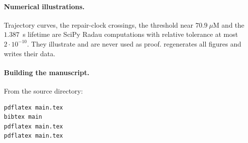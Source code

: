 \documentclass[11pt,a4paper]{article}
\theoremstyle{plain}
\theoremstyle{definition}
\theoremstyle{remark}
\newcommand{\uM}{\ensuremath{\mu\mathrm{M}}}
\begin{document}
\paragraph{Numerical illustrations.}
Trajectory curves, the repair-clock crossings, the threshold near $70.9~\uM$
and the $1.387$~s lifetime are SciPy Radau computations with relative tolerance
at most $2\cdot10^{-10}$. They illustrate and are never used as proof.
 regenerates all figures and writes their data.

\paragraph{Building the manuscript.}
From the source directory:
\begin{verbatim}
pdflatex main.tex
bibtex main
pdflatex main.tex
pdflatex main.tex
\end{verbatim}



\end{document}
